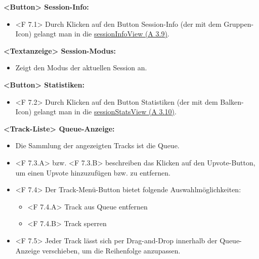 \documentclass[oneside, ngerman]{sdqtechreport}
\begin{document}
\textbf{<Button> Session-Info:}
\begin{itemize}
    \item <F 7.1> Durch Klicken auf den Button Session-Info (der mit dem Gruppen-Icon) gelangt man in die \hyperlink{sessionInfoView}{sessionInfoView (A 3.9)}.
\end{itemize}

\textbf{<Textanzeige> Session-Modus:}
\begin{itemize}
    \item Zeigt den Modus der aktuellen Session an.
\end{itemize}

\textbf{<Button> Statistiken:}
\begin{itemize}
    \item <F 7.2> Durch Klicken auf den Button Statistiken (der mit dem Balken-Icon) gelangt man in die \hyperlink{sessionStatsView}{sessionStatsView (A 3.10)}.
\end{itemize}

\textbf{<Track-Liste> Queue-Anzeige:}
\begin{itemize}
    \item Die Sammlung der angezeigten Tracks ist die Queue.
    \item <F 7.3.A> bzw. <F 7.3.B> beschreiben das Klicken auf den Upvote-Button, um einen Upvote hinzuzufügen bzw. zu entfernen.
    \item <F 7.4> Der Track-Menü-Button bietet folgende Auswahlmöglichkeiten:
    \begin{itemize}
        \hypertarget{<F 7.4.A>}{}
        \item <F 7.4.A> Track aus Queue entfernen
        \hypertarget{<F 7.4.B>}{}
        \item <F 7.4.B> Track sperren
    \end{itemize}
    \hypertarget{<F 7.5>}{}
    \item <F 7.5> Jeder Track lässt sich per Drag-and-Drop innerhalb der Queue-Anzeige verschieben, um die Reihenfolge anzupassen.
\end{itemize}
\end{document}
